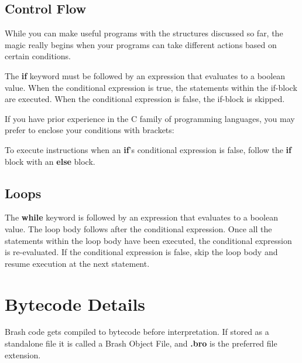 \documentclass{article}
\begin{document}
\clearpage

\subsection{Control Flow}
While you can make useful programs with the structures discussed so far, the magic really begins when your programs can take different actions based on certain conditions.

The \textbf{if} keyword must be followed by an expression that evaluates to a boolean value.
When the conditional expression is true, the statements within the if-block are executed.
When the conditional expression is false, the if-block is skipped.

If you have prior experience in the C family of programming languages, you may prefer to enclose your conditions with brackets:


To execute instructions when an \textbf{if}'s conditional expression is false, follow the \textbf{if} block with an \textbf{else} block.


\subsection{Loops}
The \textbf{while} keyword is followed by an expression that evaluates to a boolean value.
The loop body follows after the conditional expression.
Once all the statements within the loop body have been executed, the conditional expression is re-evaluated.
If the conditional expression is false, skip the loop body and resume execution at the next statement.



%







\clearpage
\section{Bytecode Details}
Brash code gets compiled to bytecode before interpretation. If stored as a standalone file it is called a Brash Object File, and \textbf{.bro} is the preferred file extension.
\end{document}

